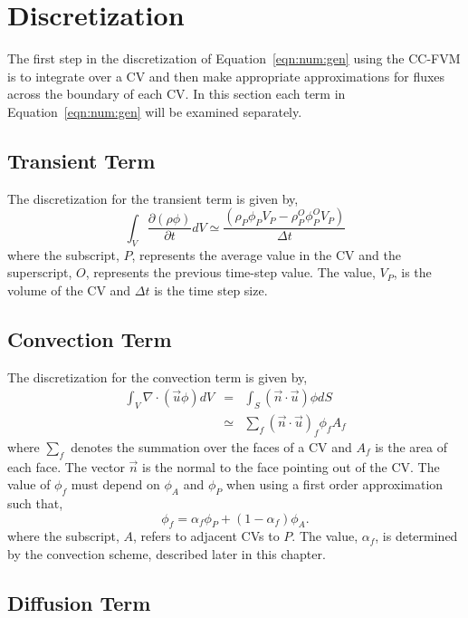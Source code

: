 \section{Discretization}

The first step in the discretization of Equation~\eqref{eqn:num:gen}
using the CC-FVM is to integrate over a CV and then make appropriate
approximations for fluxes across the boundary of each CV.  In this
section each term in Equation~\eqref{eqn:num:gen} will be examined
separately.

\subsection{Transient Term}

The discretization for the transient term is given by,
\begin{equation}
\int_V \frac{\partial (\rho \phi)}{\partial t} dV
\simeq
\frac{(\rho_{P} \phi_{P} V_P- \rho_P^O \phi_P^O V_P)}{\Delta t}
\label{eqn:num:tra}
\end{equation}
where the subscript, $P$, represents the average value in the CV and
the superscript, $O$, represents the previous time-step value.  The
value, $V_P$, is the volume of the CV and $\Delta t$ is the time step
size.

\subsection{Convection Term}

The discretization for the convection term is given by,
\begin{eqnarray}
\int_V \nabla \cdot (\vec{u} \phi) dV & = & \int_S (\vec{n} \cdot \vec{u})\phi dS \\
& \simeq & \sum_{f} (\vec{n} \cdot \vec{u})_f \phi_f A_f
\label{eqn:num:con}
\end{eqnarray}
where $\sum_{f}$ denotes the summation over the faces of a CV and
$A_f$ is the area of each face.  The vector $\vec{n}$ is the normal to
the face pointing out of the CV. The value of $\phi_f$ must depend on
$\phi_A$ and $\phi_P$ when using a first order approximation such
that,
\begin{equation}
\phi_f=\alpha_f \phi_P +(1-\alpha_f)\phi_A.
\end{equation}
where the subscript, $A$, refers to adjacent CVs to $P$. The value,
$\alpha_f$, is determined by the convection scheme, described later in
this chapter.

\subsection{Diffusion Term}

